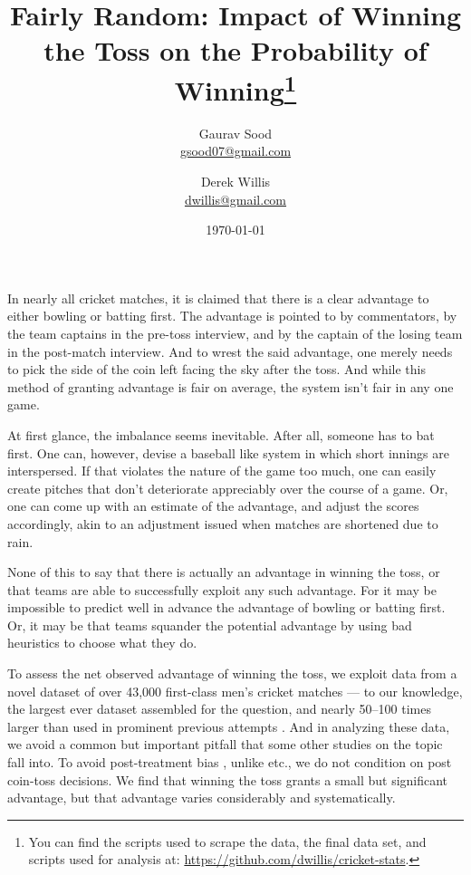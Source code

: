 \documentclass[12pt]{article}
\begin{document}
\title{\vspace{-.5cm}\normalsize{Fairly Random: Impact of Winning the Toss on the Probability of Winning\footnote{You can find the scripts used to scrape the data, the final data set, and scripts used for analysis at: \href{https://github.com/dwillis/cricket-stats}{https://github.com/dwillis/cricket-stats}.}\vspace{.5cm}}}
\author{\normalsize{Gaurav Sood}\\\href{mailto:gsood07@gmail.com}{\small{gsood07@gmail.com}} \and \normalsize{Derek Willis}\\\href{mailto:dwillis@gmail.com}{\small{dwillis@gmail.com}}}
\date{\vspace{.5cm}\normalsize{\today}}
\maketitle
\doublespacing

In nearly all cricket matches, it is claimed that there is a clear advantage to either bowling or batting first. The advantage is pointed to by commentators, by the team captains in the pre-toss interview, and by the captain of the losing team in the post-match interview. And to wrest the said advantage, one merely needs to pick the side of the coin left facing the sky after the toss. And while this method of granting advantage is fair on average, the system isn't fair in any one game. 

At first glance, the imbalance seems inevitable. After all, someone has to bat first. One can, however, devise a baseball like system in which short innings are interspersed. If that violates the nature of the game too much, one can easily create pitches that don't deteriorate appreciably over the course of a game. Or, one can come up with an estimate of the advantage, and adjust the scores accordingly, akin to an adjustment issued when matches are shortened due to rain.

None of this to say that there is actually an advantage in winning the toss, or that teams are able to successfully exploit any such advantage. For it may be impossible to predict well in advance the advantage of bowling or batting first. Or, it may be that teams squander the potential advantage by using bad heuristics to choose what they do. 

To assess the net observed advantage of winning the toss, we exploit data from a novel dataset of over 43,000 first-class men's cricket matches --- to our knowledge, the largest ever dataset assembled for the question, and nearly 50--100 times larger than used in prominent previous attempts \citep[see,][]{dawson2009bat, de1998winning}. And in analyzing these data, we avoid a common but important pitfall that some other studies on the topic fall into. To avoid post-treatment bias \citep[see][]{acharya2015}, unlike \citet{dawson2009bat, Saad2015} etc., we do not condition on post coin-toss decisions. We find that winning the toss grants a small but significant advantage, but that advantage varies considerably and systematically. 
\end{document}
